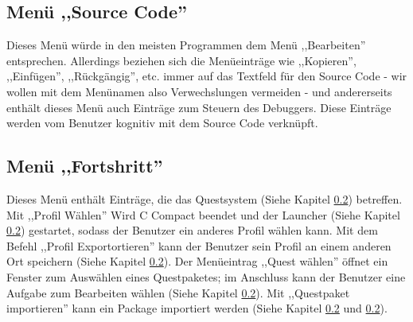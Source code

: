 \subsection{Menü ,,Source Code''}
Dieses Menü würde in den meisten Programmen dem Menü ,,Bearbeiten'' entsprechen. Allerdings beziehen sich die Menüeinträge wie ,,Kopieren'', ,,Einfügen'', ,,Rückgängig'', etc. immer auf das Textfeld für den Source Code - wir wollen mit dem Menünamen also Verwechslungen vermeiden - und andererseits enthält dieses Menü auch Einträge zum Steuern des Debuggers. Diese Einträge werden vom Benutzer kognitiv mit dem Source Code verknüpft.

\subsection{Menü ,,Fortshritt''}
Dieses Menü enthält Einträge, die das Questsystem (Siehe Kapitel \ref{}) betreffen. Mit ,,Profil Wählen'' Wird C Compact beendet und der Launcher (Siehe Kapitel \ref{}) gestartet, sodass der Benutzer ein anderes Profil wählen kann. Mit dem Befehl ,,Profil Exportortieren'' kann der Benutzer sein Profil an einem anderen Ort speichern (Siehe Kapitel \ref{}). Der Menüeintrag ,,Quest wählen'' öffnet ein Fenster zum Auswählen eines Questpaketes; im Anschluss kann der Benutzer eine Aufgabe zum Bearbeiten wählen (Siehe Kapitel \ref{}). Mit ,,Questpaket importieren'' kann ein Package importiert werden (Siehe Kapitel \ref{} und \ref{}).


